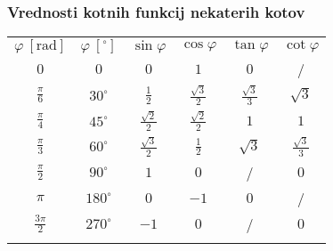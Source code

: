         \begin{frame}
            \frametitle{Vrednosti kotnih funkcij nekaterih kotov}


            \begin{table}
                \centering
                \large
                \addtolength{\tabcolsep}{6pt}
                \renewcommand{\arraystretch}{1.5}                
                \begin{tabular}{||c|c||c|c|c|c||} 
                    \hhline{|t:==:t:====:t|}
                    \rowcolor[rgb]{0.863,0.745,0.745}  
                            $\varphi~\left[\textrm{rad}\right] $ & $\varphi~\left[^\circ\right] $ & $\sin\varphi$ & $\cos\varphi$ & $\tan\varphi$ & $\cot\varphi$  \\ 
                    \hhline{|:==::====:|}
                            $0$ & $0$  & $0$ & $1$ & $0$ & /  \\ 
                    \hline
                            $\frac{\pi}{6}$ & $30^\circ$ & $\frac{1}{2}$ & $\frac{\sqrt{3}}{2}$ & $\frac{\sqrt{3}}{3}$ & $\sqrt{3}$  \\ 
                    \hline
                            $\frac{\pi}{4}$ & $45^\circ$ & $\frac{\sqrt{2}}{2}$ & $\frac{\sqrt{2}}{2}$ & $1$ & $1$  \\ 
                    \hline
                            $\frac{\pi}{3}$ & $60^\circ$ & $\frac{\sqrt{3}}{2}$ & $\frac{1}{2}$ & $\sqrt{3}$ & $\frac{\sqrt{3}}{3}$  \\ 
                    \hline
                            $\frac{\pi}{2}$ & $90^\circ$ & $1$ & $0$ & / & $0$  \\  
                    \hline
                            $\pi$ & $180^\circ$ & $0$ & $-1$ & $0$ & /  \\ 
                    \hline
                            $\frac{3\pi}{2}$ & $270^\circ$ & $-1$ & $0$ & / & $0$  \\ 
                    \hhline{|b:==:b:====:b|}
                \end{tabular}
            \end{table}

        \end{frame}

